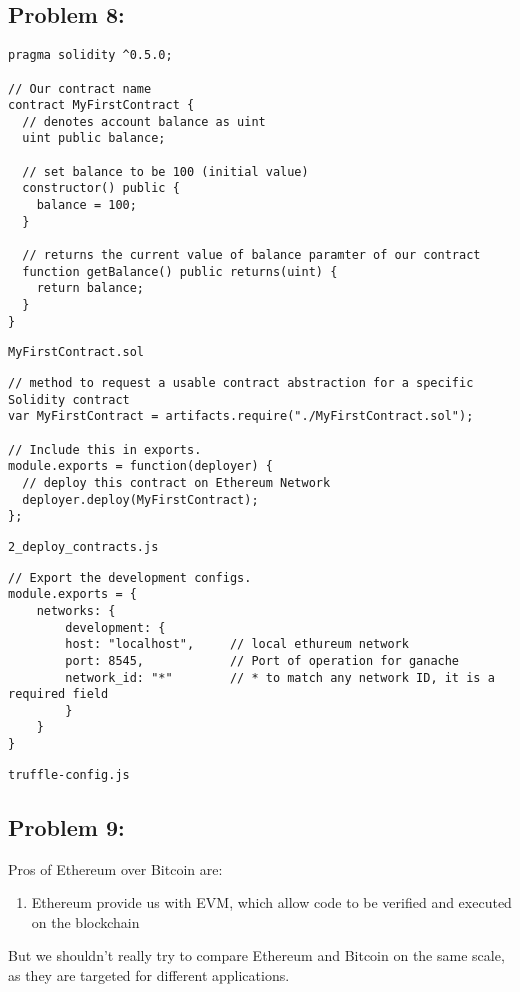 \documentclass[a4paper]{article}
\begin{document}
\subsection*{Problem 8:}
\begin{lstlisting}[style=C++]
pragma solidity ^0.5.0;

// Our contract name
contract MyFirstContract {
  // denotes account balance as uint
  uint public balance;
  
  // set balance to be 100 (initial value)     
  constructor() public {
    balance = 100;
  }

  // returns the current value of balance paramter of our contract
  function getBalance() public returns(uint) {
    return balance;
  }
}
\end{lstlisting}
\texttt{MyFirstContract.sol}


\begin{lstlisting}[style=C++]
// method to request a usable contract abstraction for a specific Solidity contract
var MyFirstContract = artifacts.require("./MyFirstContract.sol");

// Include this in exports.
module.exports = function(deployer) {
  // deploy this contract on Ethereum Network
  deployer.deploy(MyFirstContract);
};
\end{lstlisting}
\texttt{2\_deploy\_contracts.js}


\begin{lstlisting}[style=C++]
// Export the development configs.
module.exports = {
    networks: {
        development: {
        host: "localhost",     // local ethureum network
        port: 8545,            // Port of operation for ganache
        network_id: "*"        // * to match any network ID, it is a required field
        }
    }
}
\end{lstlisting}
\texttt{truffle-config.js}

\subsection*{Problem 9:}

Pros of Ethereum over Bitcoin are:
\begin{enumerate}
    \item Ethereum provide us with EVM, which allow code to be verified and executed on the blockchain
\end{enumerate}

But we shouldn't really try to compare Ethereum and Bitcoin on the same scale,
as they are targeted for different applications.
\end{document}
